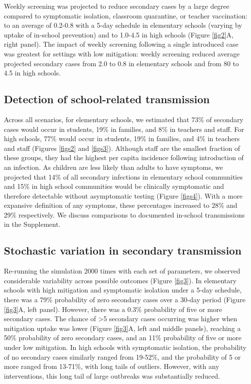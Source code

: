 \documentclass[
]{article}
\begin{document}
Weekly screening was projected to reduce secondary cases by a large
degree compared to symptomatic isolation, classroom quarantine, or
teacher vaccination: to an average of 0.2-0.8 with a 5-day schedule in
elementary schools (varying by uptake of in-school prevention) and to
1.0-4.5 in high schools (Figure \ref{fig2}A, right panel). The impact of
weekly screening following a single introduced case was greatest for
settings with low mitigation: weekly screening reduced average projected
secondary cases from 2.0 to 0.8 in elementary schools and from 80 to 4.5
in high schools.

\hypertarget{detection-of-school-related-transmission}{%
\subsection{Detection of school-related
transmission}\label{detection-of-school-related-transmission}}

Across all scenarios, for elementary schools, we estimated that 73\% of
secondary cases would occur in students, 19\% in families, and 8\% in
teachers and staff. For high schools, 77\% would occur in students, 19\%
in families, and 4\% in teachers and staff (Figures \ref{figs2} and
\ref{figs3}). Although staff are the smallest fraction of these groups,
they had the highest per capita incidence following introduction of an
infection. As children are less likely than adults to have symptoms, we
projected that 14\% of all secondary infections in elementary school
communities and 15\% in high school communities would be clinically
symptomatic and therefore detectable without asymptomatic testing
(Figure \ref{figs4}). With a more expansive definition of any symptoms,
these percentages increased to 28\% and 29\% respectively. We discuss
comparisons to documented in-school transmissions in the Supplement.

\hypertarget{stochastic-variation-in-secondary-transmission}{%
\subsection{Stochastic variation in secondary
transmission}\label{stochastic-variation-in-secondary-transmission}}

Re-running the simulation 2000 times with each set of parameters, we
observed considerable variability across possible outcomes (Figure
\ref{fig3}). In elementary schools with high mitigation and symptomatic
isolation under a 5-day schedule, there was a 79\% probability of zero
secondary cases over a 30-day period (Figure \ref{fig3}A, left panel).
However, there was a 0.3\% probability of five or more secondary cases.
The chance of \textgreater5 secondary cases occurring was higher when
mitigation uptake was lower (Figure \ref{fig3}A, left and middle
panels), reaching a 50\% probability of zero secondary cases, and an
11\% probability of five or more under low mitigation. In high schools
with symptomatic isolation, the probability of no secondary cases
similarly ranged from 19-52\%, and the probability of 5 or more ranged
from 13-71\%, with long tails of outliers. However, with any
interventions, this long tail of large outbreaks was substantially
reduced.
\end{document}
